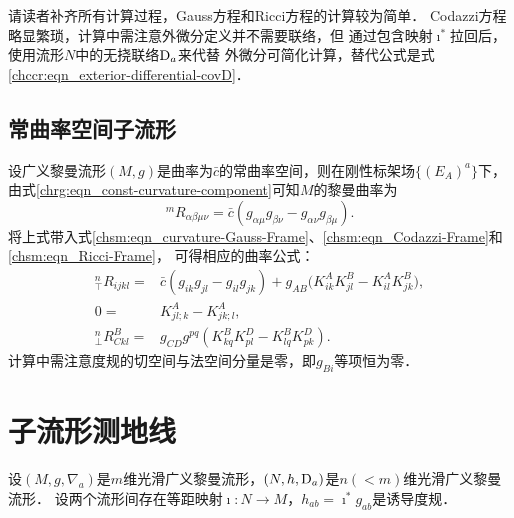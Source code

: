 请读者补齐所有计算过程，Gauss方程和Ricci方程的计算较为简单．
Codazzi方程略显繁琐，计算中需注意外微分定义并不需要联络，但
通过包含映射$\imath^*$拉回后，使用流形$N$中的无挠联络${\rm D}_a$来代替
外微分可简化计算，替代公式是式\eqref{chccr:eqn_exterior-differential-covD}．

\subsection{常曲率空间子流形}
设广义黎曼流形$(M,g)$是曲率为$\bar{c}$的常曲率空间，则在刚性标架场$\{(E_A)^a\}$下，
由式\eqref{chrg:eqn_const-curvature-component}可知$M$的黎曼曲率为
\begin{equation}
    {}^m R_{\alpha\beta\mu\nu}= \bar{c} ( g_{\alpha\mu}g_{\beta\nu}- g_{\alpha\nu}g_{\beta\mu}  ).
\end{equation}
将上式带入式\eqref{chsm:eqn_curvature-Gauss-Frame}、\eqref{chsm:eqn_Codazzi-Frame}和\eqref{chsm:eqn_Ricci-Frame}，
可得相应的曲率公式：
\begin{align}
    {}^{n}_{\top}{R}_{ijkl} =& \bar{c} ( g_{ik}g_{jl}- g_{il}g_{jk}  )
    +{g}_{AB} \bigl(K^A_{ik}K^B_{jl} - K^A_{il} K^B_{jk} \bigr),  \\
    0 =& K^A_{jl;k}- K^A_{jk;l} ,\\
    {}^{n}_{\bot}{R}^B_{C kl} =&
    g_{CD} g^{pq} (K^B_{kq}K^D_{pl} - K^B_{lq} K^D_{pk}) .
\end{align}
计算中需注意度规的切空间与法空间分量是零，即$g_{B i}$等项恒为零．



\section{子流形测地线}\label{chsm:sec_sub-Geodesic}
设$(M,g,\nabla_a)$是$m$维光滑广义黎曼流形，$(N,h,{\rm D}_a)$是$n(<m)$维光滑广义黎曼流形．
设两个流形间存在等距映射$\imath:N \to M$，$h_{ab}=\imath^* {g}_{ab}$是诱导度规．


